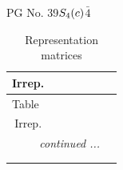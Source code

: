 \documentclass[fleqn,8pt,landscape]{jsarticle}
\begin{document}
\setcounter{MaxMatrixCols}{32}

\renewcommand{\tablename}{Table~}
\renewcommand{\figurename}{Figure~}
\begin{center}
\LARGE
PG No. 39\quad$S_{\rm 4}(c)$\quad$\bar{4}$\quad[ tetragonal ]
\end{center}
\renewcommand{\arraystretch}{1.2}
\begin{longtable}{ccccccc}
\caption{Representation matrices}
 \\
 \hline \hline
Irrep. &  &  &  &  &  &  \\ \hline \endfirsthead

\multicolumn{6}{l}{\tablename\ \thetable{}} \\
 \hline \hline
Irrep. &  &  &  &  &  &  \\ \hline \endhead

 \hline \hline
\multicolumn{6}{r}{\footnotesize\it continued ...} \\ \endfoot

 \hline \hline
\multicolumn{6}{r}{} \\ \endlastfoot


\end{longtable}
\end{document}
